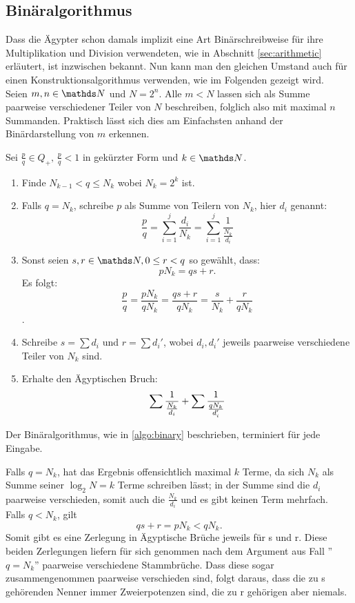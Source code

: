 \subsection{Binäralgorithmus}

Dass die Ägypter schon damals implizit eine Art Binärschreibweise für ihre Multiplikation und Division verwendeten, wie in Abschnitt \ref{sec:arithmetic} erläutert, ist inzwischen bekannt. Nun kann man den gleichen Umstand auch für einen Konstruktionsalgorithmus verwenden, wie im Folgenden gezeigt wird.\\
Seien $m, n \in \N$ und $N = 2^n$. Alle $m < N$ lassen sich als Summe paarweise verschiedener Teiler von $N$ beschreiben, folglich also mit maximal $n$ Summanden. Praktisch lässt sich dies am Einfachsten anhand der Binärdarstellung von $m$ erkennen.

\begin{algorithm}\label{algo:binary}
	Sei $\frac{p}{q} \in Q_+, \, \frac{p}{q} < 1$ in gekürzter Form und $k \in \N$.
	\begin{enumerate}
		\item Finde $N_{k-1} < q \leq N_k$ wobei $N_k=2^k$ ist.
		\item Falls $q = N_k$, schreibe $p$ als Summe von Teilern von $N_k$, hier $d_i$ genannt:
		$$\frac{p}{q} = \sum_{i=1}^{j} \frac{d_i}{N_k}=  \sum_{i = 1}^{j}\frac{1}{\frac{N_k}{d_i}}$$
		\item Sonst seien $s, r \in \N, 0 \leq r < q$ so gewählt, dass:
		$$pN_k = qs+r.$$
		Es folgt:
		$$\frac{p}{q} = \frac{p N_k}{q N_k} = \frac{qs + r}{q N_k} = \frac{s}{N_k} + \frac{r}{q N_k}$$.
		\item Schreibe $s = \sum d_i$ und $r = \sum d_i'$, wobei $d_i, d_i'$ jeweils paarweise verschiedene Teiler von $N_k$ sind.
		\item Erhalte den Ägyptischen Bruch:
		$$\sum \frac{1}{\frac{N_k}{d_i}} + \sum \frac{1}{\frac{q N_k}{d_i'}}$$
	\end{enumerate}
\end{algorithm}

\begin{satz}
	Der Binäralgorithmus, wie in \ref{algo:binary} beschrieben, terminiert für jede Eingabe.
\end{satz}

\begin{bew}
	Falls $q = N_k$, hat das Ergebnis offensichtlich maximal $k$ Terme, da sich $N_k$ als Summe seiner $\log_2 N = k$ Terme schreiben lässt; in der Summe sind die $d_i$ paarweise verschieden, somit auch die $\frac{N_k}{d_i}$ und es gibt keinen Term mehrfach.\\
	Falls $q < N_k$, gilt
	$$qs+r = p N_k < q N_k.$$
	Somit gibt es eine Zerlegung in Ägyptische Brüche jeweils für s und r. Diese beiden Zerlegungen liefern für sich genommen nach dem Argument aus Fall ''$q = N_k$'' paarweise verschiedene Stammbrüche. Dass diese sogar zusammengenommen paarweise verschieden sind, folgt daraus, dass die zu s gehörenden Nenner immer Zweierpotenzen sind, die zu r gehörigen aber niemals.
\end{bew}


